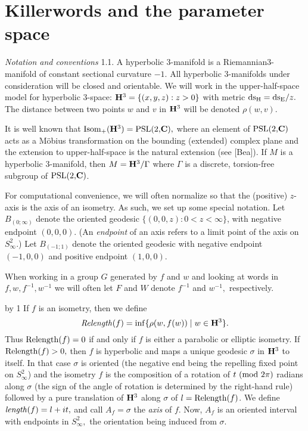 \def\Relength{{\rm Relength}}
\def\length{{\rm length}}
\def\Arccosh{{\rm Arccosh}}
\def\trace{{\rm trace}}
\def\distance{{\rm distance}}

\vglue-8pt
\section{Killerwords and the parameter space}
\vglue-4pt

{\it Notation and conventions} 1.1.
A hyperbolic $3$-manifold is a Riemannian\break $3$-manifold of constant sectional curvature $-1$.  All hyperbolic $3$-manifolds under
consideration will be closed and orientable. We will work in the upper-half-space model for
hyperbolic 3-space:  ${\bf H}^3 = \{(x,y,z): z > 0\}$ with 
metric ${\rm ds_H} = {\rm ds_E}/z.$ The distance between two points $w$ and $v$ in ${\bf H}^3$ will be denoted $\rho(w,v).$

It is well known that  
${\rm Isom}_+({\bf H}^3) = {\rm PSL(2,}{\bf C}),$  
where an element of\break
${\rm PSL(2,}{\bf C})$ acts as a M\"obius transformation on the bounding (extended) complex plane and the extension to upper-half-space is the natural extension
 (see [Bea]).  
If $M$ is a hyperbolic $3$-manifold, then $M={\bf H}^3/\Gamma$ where $\Gamma$ is a 
discrete, torsion-free subgroup of ${\rm PSL(2,}{\bf C})$.   

For computational convenience, we will often normalize so that the (positive) $z$-axis is the axis of an isometry.  As such, we set up some special notation.
Let $B_{(0;\infty)}$ denote the oriented geodesic $\{(0,0,z): 0< z < \infty \}$,
with negative endpoint $(0,0,0).$  (An {\it endpoint} of an axis refers to a limit point of the axis on $S^2_{\infty}$.) Let $B_{(-1;1)}$ denote the
oriented geodesic with negative endpoint $(-1,0,0)$ and positive endpoint $(1,0,0)$.

When working in a group $G$ generated by $f$ and $w$ and looking 
at words in $f,w, f^{-1}, w^{-1}$ we will often let $F$ and $W$ denote
$f^{-1}$ and $w^{-1},$ respectively.

\advance\theoremcount by 1
 If $f$ is an isometry, then we define
$${\it Relength}(f)=\inf\{\rho(w,f(w))\mid w\in {\bf H}^3\}.$$
Thus $\Relength(f)=0$ if and only if $f$ is either a parabolic or elliptic
isometry.  If $\Relength(f) > 0,$ then $f$
is hyperbolic and maps a unique geodesic $\sigma$ in ${\bf H}^3$ to itself. In that case
$\sigma$ is oriented (the negative end
being the repelling fixed point on $S^2_\infty$)  and the isometry $f$ is the
composition of a  rotation of $t \ ({\rm mod}\ 2\pi)$
radians along $\sigma$ (the sign of the angle of rotation is determined by the right-hand rule) followed by a pure translation of ${\bf H}^3$ along $\sigma$ of
$l = \Relength(f)$.  We define
${\it length}(f)=l+it,$ and call $A_f = \sigma$ the {\it axis} of $f.$  Now,  $A_f$ is an oriented interval with endpoints in $S^2_{\infty},$ the
orientation being induced from $\sigma.$

